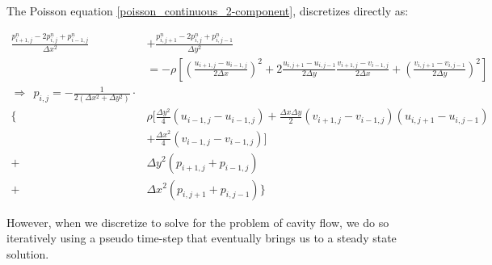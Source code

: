 \documentclass[11pt]{article}
\begin{document}
{The Poisson equation \eqref{poisson_continuous_2-component}, discretizes directly as:

\begin{align}
\frac{p_{i+1,j}^{n} - 2p_{i,j}^n + p_{i-1,j}^{n}}{\Delta x^2} &
	 + \frac{p_{i,j+1}^n - 2p_{i,j}^n + p_{i,j-1}^n}{\Delta y^2} \nonumber \\ \nonumber
&	= -\rho
	   \left[
	   		  \left( \frac{u_{i+1,j} - u_{i-1,j}}{2\Delta x} \right)^2
	   		+2\frac{u_{i,j+1} - u_{i,j-1}}{2\Delta y} \frac{v_{i+1,j} - v_{i-1,j}}{2\Delta x}
	   		+ \left( \frac{v_{i,j+1} - v_{i,j-1}}{2\Delta y} \right)^2
	   \right] \\ \nonumber
\Rightarrow ~~
p_{i,j} = -\frac{1}{2(\Delta x^2 + \Delta y^2)} \cdot &
	\\ \nonumber
	\lbrace&
		\rho \Biggl[ \frac{\Delta y^2}{4} (u_{i-1,j} - u_{i-1,j})
			+ \frac{\Delta x \Delta y}{2} (v_{i+1,j} - v_{i-1,j})(u_{i,j+1} - u_{i,j-1})\\
					&+ \frac{\Delta x^2}{4} (v_{i-1,j} - v_{i-1,j})
			 \Biggr]
			 												\nonumber \\
		+& \Delta y^2 (p_{i+1,j} + p_{i-1,j})
															\nonumber \\
		+& \Delta x^2 (p_{i,j+1} + p_{i,j-1})
	\rbrace \nonumber
\end{align}

However, when we discretize to solve for the problem of cavity flow, we do so iteratively
using a pseudo time-step that eventually brings us to a steady state solution.

}
\end{document}

